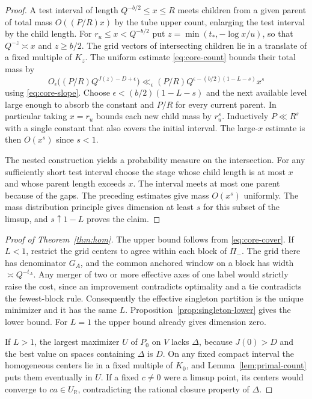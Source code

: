 \documentclass[11pt,reqno,a4paper]{amsart}
\theoremstyle{remark}
\numberwithin{equation}{section}
\begin{document}
\begin{proof}
A test interval of length $Q^{-b/2}\le x\le R$ meets children
from a given parent of total mass $O((P/R)x)$ by the tube upper
count, enlarging the test interval by the child length. For
$r_u\le x<Q^{-b/2}$ put $z=\min(t_*,-\log x/u)$, so that
$Q^{-z}\asymp x$ and $z\ge b/2$. The grid vectors of intersecting
children lie in a translate of a fixed multiple of $K_z$.
The uniform estimate \eqref{eq:core-count} bounds their total
mass by
\[
 O_\epsilon\bigl((P/R)Q^{J(z)-D+\epsilon}\bigr)
 \ll_\epsilon (P/R)Q^{\epsilon-(b/2)(1-L-s)}x^s
\]
using \eqref{eq:core-slope}. Choose
$\epsilon<(b/2)(1-L-s)$ and the next available level large
enough to absorb the constant and $P/R$ for every current parent.
In particular taking $x=r_u$ bounds each new child mass by $r_u^s$.
Inductively $P\ll R^s$ with a single constant that also covers
the initial interval. The large-$x$ estimate is then $O(x^s)$
since $s<1$.

The nested construction yields a probability measure on the
intersection. For any sufficiently short test interval choose
the stage whose child length is at most $x$ and whose parent
length exceeds $x$. The interval meets at most one parent
because of the gaps. The preceding estimates give mass
$O(x^s)$ uniformly. The mass distribution principle gives
dimension at least $s$ for this subset of the limsup, and
$s\uparrow 1-L$ proves the claim.
\end{proof}

\begin{proof}[Proof of Theorem~\ref{thm:hom}]
The upper bound follows from \eqref{eq:core-cover}. If $L<1$,
restrict the grid centers to agree within each block of $\Pi_-$.
The grid there has denominator $G_A$, and the common anchored
window on a block has width $\asymp Q^{-t_A}$. Any merger of two
or more effective axes of one label would strictly raise the
cost, since an improvement contradicts optimality and a tie
contradicts the fewest-block rule. Consequently the effective
singleton partition is the unique minimizer and it has the
same $L$. Proposition~\ref{prop:singleton-lower} gives the lower
bound. For $L=1$ the upper bound already gives dimension zero.

If $L>1$, the largest maximizer $U$ of $P_0$ on $V$ lacks
$\Delta$, because $J(0)>D$ and the best value on spaces
containing $\Delta$ is $D$. On any fixed compact interval the
homogeneous centers lie in a fixed multiple of $K_0$, and
Lemma~\ref{lem:primal-count} puts them eventually in $U$.
If a fixed $c\ne0$ were a limsup point, its centers would
converge to $ca\in U_{\mathbb R}$, contradicting the rational
closure property of $\Delta$.
\end{proof}
\end{document}
